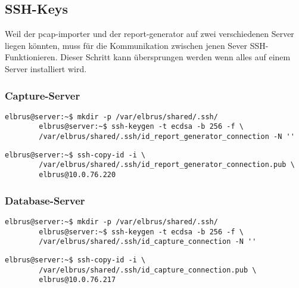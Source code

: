 	\subsection{SSH-Keys}
	Weil der pcap-importer und der report-generator auf zwei verschiedenen Server liegen könnten, muss für die Kommunikation zwischen jenen Sever SSH-Funktionieren.
	\newline\newline
	Dieser Schritt kann übersprungen werden wenn alles auf einem Server installiert wird.
	
	\lstset{style=commands}
	\subsubsection{Capture-Server}
	\begin{lstlisting}[caption={Anlegen der SSH-Keys.}]
		elbrus@server:~$ mkdir -p /var/elbrus/shared/.ssh/
		elbrus@server:~$ ssh-keygen -t ecdsa -b 256 -f \
		/var/elbrus/shared/.ssh/id_report_generator_connection -N ''
	\end{lstlisting}
	
	\begin{lstlisting}[caption={Übertragen der SSH-Keys auf den Database-Server.}]
		elbrus@server:~$ ssh-copy-id -i \
		/var/elbrus/shared/.ssh/id_report_generator_connection.pub \
		elbrus@10.0.76.220
	\end{lstlisting}
	
	\subsubsection{Database-Server}
	\begin{lstlisting}[caption={Anlegen der SSH-Keys.}]
		elbrus@server:~$ mkdir -p /var/elbrus/shared/.ssh/
		elbrus@server:~$ ssh-keygen -t ecdsa -b 256 -f \
		/var/elbrus/shared/.ssh/id_capture_connection -N ''
	\end{lstlisting}
	
	\begin{lstlisting}[caption={Übertragen der SSH-Keys auf den Capture-Server.}]
		elbrus@server:~$ ssh-copy-id -i \
		/var/elbrus/shared/.ssh/id_capture_connection.pub \
		elbrus@10.0.76.217
	\end{lstlisting}
